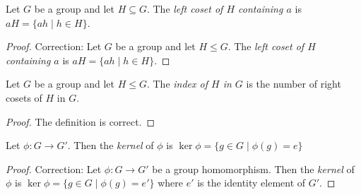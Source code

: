 \begin{exercise}
    Let $G$ be a group and let $H\subseteq G$. The \textit{left coset of $H$ containing $a$} is $aH = \{ ah \mid h\in H \}$.
\end{exercise}

\begin{proof}
    Correction: Let $G$ be a group and let $H\leq G$. The \textit{left coset of $H$ containing $a$} is $aH = \{ ah \mid h\in H \}$.
\end{proof}

\begin{exercise}
    Let $G$ be a group and let $H\leq G$. The \textit{index of $H$ in $G$} is the number of right cosets of $H$ in $G$.
\end{exercise}

\begin{proof}
    The definition is correct.
\end{proof}

\begin{exercise}
    Let $\phi: G\to G'$. Then the \textit{kernel} of $\phi$ is $\ker\phi = \{ g \in G \mid \phi(g) = e \}$
\end{exercise}

\begin{proof}
    Correction: Let $\phi: G\to G'$ be a group homomorphism. Then the \textit{kernel} of $\phi$ is $\ker\phi = \{ g \in G \mid \phi(g) = e' \}$ where $e'$ is the identity element of $G'$.
\end{proof}

